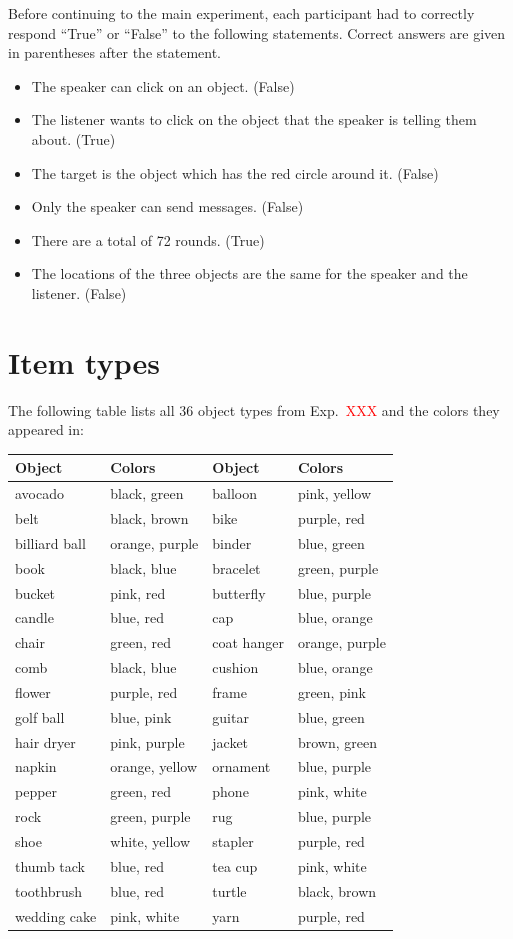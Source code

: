 \documentclass[11pt]{article}
\newcommand{\red}[1]{\textcolor{Red}{#1}}
\begin{document}
Before continuing to the main experiment, each participant had to correctly respond ``True'' or ``False'' to the following statements. Correct answers are given in parentheses after the statement.

\begin{itemize}
	\item The speaker can click on an object. (False)
	\item The listener wants to click on the object that the speaker is
  telling them about. (True)
  \item  The target is the object which has the red circle around it. (False)
  \item Only the speaker can send messages. (False)
  \item There are a total of 72 rounds. (True)
  \item The locations of the three objects are the same for the speaker and the listener. (False)
\end{itemize}


\section{Item types}
\label{app:itemtypes}

The following table lists all 36 object types from Exp.~\red{XXX} and the colors they appeared in:

\begin{tabular}{l l l l}
\toprule
Object & Colors & Object & Colors \\
\midrule
avocado & black, green & balloon & pink, yellow \\
belt & black, brown & bike & purple, red\\
billiard ball & orange, purple & binder & blue, green \\
book & black, blue & bracelet & green, purple \\
bucket & pink, red & butterfly & blue, purple\\
candle & blue, red & cap & blue, orange \\
chair & green, red & coat hanger & orange, purple \\
comb & black, blue & cushion & blue, orange\\
flower & purple, red & frame & green, pink \\
golf ball & blue, pink & guitar & blue, green\\
hair dryer & pink, purple & jacket & brown, green\\
napkin & orange, yellow & ornament & blue, purple\\
pepper & green, red & phone & pink, white\\
rock & green, purple & rug & blue, purple \\
shoe & white, yellow & stapler & purple, red\\
thumb tack & blue, red & tea cup & pink, white \\
toothbrush & blue, red & turtle & black, brown \\
wedding cake & pink, white & yarn & purple, red\\
\bottomrule
\end{tabular}
\end{document}

